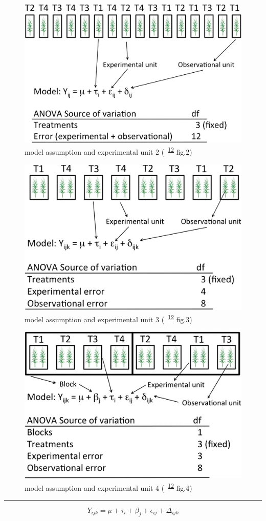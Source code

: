 \documentclass[
]{book}
\theoremstyle{definition}
\theoremstyle{definition}
\theoremstyle{definition}
\theoremstyle{definition}
\theoremstyle{remark}
\begin{document}
\begin{figure}
\includegraphics[width=0.5\linewidth]{img/casler2015-fig2} \caption{model assumption and experimental unit 2 (~\textsuperscript{\protect\hyperlink{ref-casler2015}{12}} fig.2)}\label{fig:unnamed-chunk-4}
\end{figure}

\begin{figure}
\includegraphics[width=0.5\linewidth]{img/casler2015-fig3} \caption{model assumption and experimental unit 3 (~\textsuperscript{\protect\hyperlink{ref-casler2015}{12}} fig.3)}\label{fig:unnamed-chunk-5}
\end{figure}

\begin{figure}
\includegraphics[width=0.5\linewidth]{img/casler2015-fig4} \caption{model assumption and experimental unit 4 (~\textsuperscript{\protect\hyperlink{ref-casler2015}{12}} fig.4)}\label{fig:unnamed-chunk-6}
\end{figure}

\begin{center}\rule{0.5\linewidth}{0.5pt}\end{center}

\[
Y_{{\scriptscriptstyle ijk}}=\mu+\tau_{{\scriptscriptstyle i}}+\beta_{{\scriptscriptstyle j}}+\epsilon_{{\scriptscriptstyle ij}}+\varDelta_{{\scriptscriptstyle ijk}}
\]
\end{document}
